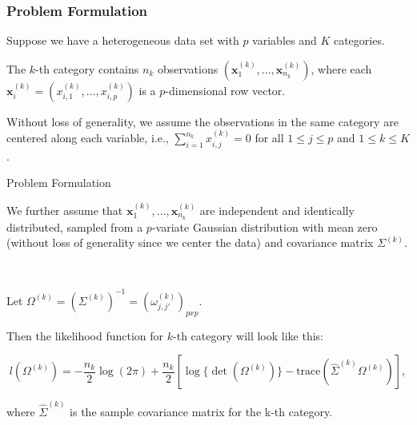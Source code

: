 \documentclass[t]{beamer}
\begin{document}
  \begin{frame}
\frametitle{Problem Formulation}
  
 
  Suppose we have a heterogeneous data set with $p$ variables and $K$ categories.
  
\bigskip
\pause
   The $k$-th
  category contains $n_k$ observations $(\boldsymbol{x}_1^{(k)},...,\boldsymbol{x}_{n_k}^{(k)})$, where each $\boldsymbol{x}_i^{(k)} = (x_{i,1}^{(k)},...,x_{i,p}^{(k)})$ is a $p$-dimensional row vector.
\bigskip
\pause

   Without loss of generality, we assume the observations in the same category are centered along each variable, i.e., $\sum_{i=1}^{n_k} x_{i,j}^{(k)} = 0$ for all $1 \leq j \leq p$ and $1 \leq k \leq K$.
 
  \end{frame}
  


  \begin{frame}{Problem Formulation}
  
   We further assume that $\boldsymbol{x}_1^{(k)},...,\boldsymbol{x}_{n_k}^{(k)}$ are independent and identically distributed, sampled
    from a $p$-variate Gaussian distribution with mean zero (without loss of generality since we
    center the data) and covariance matrix $\Sigma^{(k)}$. 
    
    \
    
     Let $\Omega^{(k)} = (\Sigma^{(k)})^{-1} = (\omega_{j,j'}^{(k)})_{pxp}$.
     
\bigskip
\pause
     
     Then the likelihood function for $k$-th category will look like this:
 
 
  \begin{equation*} l(\Omega^{(k)}) = -\frac{n_k}{2} \log(2\pi) + \frac{n_k}{2}[ \log\{ \det(\Omega^{(k)})\} - \mbox{trace}(\hat{\Sigma}^{(k)} \Omega^{(k)})], \end{equation*}
   
  
   where $\hat{\Sigma}^{(k)}$ is the sample covariance matrix for the k-th category.
   
   \end{frame}
   
\end{document}
